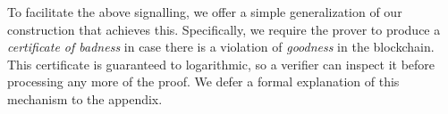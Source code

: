  To facilitate the above signalling, we offer a simple generalization of our
construction that achieves this.
Specifically, we require the prover to produce a
\textit{certificate of badness} in case there is a violation of
\textit{goodness} in the blockchain.
This certificate is guaranteed to logarithmic, so a verifier can inspect it
before processing any more of the proof.
We defer a formal explanation of this mechanism to the appendix.
